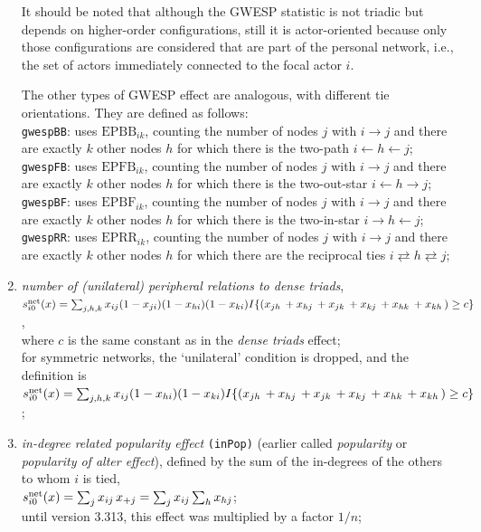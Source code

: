 \documentclass[a4paper,fleqn,11pt]{article}
\newcommand{\+}{\, + \,}
\newcommand{\vit}{\theenumi}
\begin{document}
\begin{enumerate}
It should be noted that although the GWESP statistic is not triadic but
depends on higher-order configurations, still it is actor-oriented
because only those configurations are considered that are part of the
personal network, i.e., the set of actors immediately connected
to the focal actor $i$.

The other types of GWESP effect are analogous, with
different tie orientations. They are defined as follows:\\
\texttt{gwespBB}: uses $\text{EPBB}_{ik}$, counting the number of nodes $j$
with $i \rightarrow j$ and there are exactly $k$ other
nodes $h$ for which there is the two-path $i \leftarrow h \leftarrow j$;\\
\texttt{gwespFB}: uses $\text{EPFB}_{ik}$, counting the number of nodes $j$
with $i \rightarrow j$ and there are exactly $k$ other
nodes $h$ for which there is the two-out-star $i \leftarrow h \rightarrow j$;\\
\texttt{gwespBF}: uses $\text{EPBF}_{ik}$, counting the number of nodes $j$
with $i \rightarrow j$ and there are exactly $k$ other
nodes $h$ for which there is the two-in-star $i \rightarrow h \leftarrow j$;\\
\texttt{gwespRR}: uses $\text{EPRR}_{ik}$, counting the number of nodes $j$
with $i \rightarrow j$ and there are exactly $k$ other
nodes $h$ for which there are the reciprocal ties $i \rightleftarrows h \rightleftarrows j$;

 \item {\em number of (unilateral) peripheral relations to dense triads},\\
 $s^{\rm net}_{i\vit}(x) =  \sum_{j,h,k} x_{ij} (1-x_{ji})(1-x_{hi})(1-x_{ki})
 I\{ (x_{jh}\,  + x_{hj}\, + x_{jk}\, + x_{kj}\, + x_{hk}\, + x_{kh}\,)\geq c \} \,$,\\
 where $c$ is the same constant as in the {\it dense triads} effect;\\
 for symmetric networks, the `unilateral' condition is dropped, and the definition is\\
 $s^{\rm net}_{i\vit}(x) =  \sum_{j,h,k} x_{ij} (1-x_{hi})(1-x_{ki})
 I\{ (x_{jh}\,  + x_{hj}\, + x_{jk}\, + x_{kj}\, + x_{hk}\, + x_{kh}\,)\geq c \} \,$;

 \item {\em in-degree related popularity effect} \texttt{(inPop)}
 (earlier called {\em popularity} or {\em popularity of alter effect}), defined by
  the sum of
 the in-degrees of the others to whom $i$ is tied,\\
 $s^{\rm net}_{i\vit}(x) =  \sum_j x_{ij}\, x_{+j} =
 \sum_j x_{ij} \sum_h x_{hj} $;\\
 until version 3.313, this effect was multiplied by a factor $1/n$;


\end{enumerate}
\end{document}
